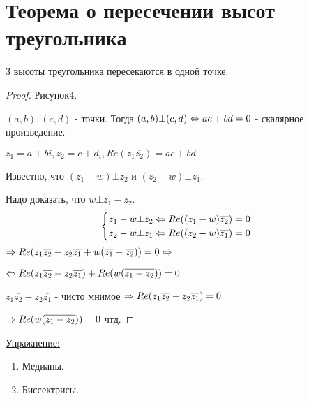 \section{Теорема о пересечении высот треугольника}
\begin{theorem}{} 3 высоты треугольника пересекаются в одной точке.
\end{theorem}
\begin{proof}
Рисунок4.

$(a, b), (c, d)$ - точки. Тогда $(a, b) \bot (c, d) \Leftrightarrow ac + bd = 0$ - скалярное произведение.

$z_1 = a + bi, z_2 = c + d_i, Re(z_1\overline{z_2}) = ac + bd$

Известно, что $(z_1 - w) \bot z_2$ и $(z_2 - w) \bot z_1$.

Надо доказать, что $w \bot z_1 - z_2$.
$$
\begin{cases}
	z_1 - w \bot z_2 \Leftrightarrow Re((z_1 - w)\overline{z_2}) = 0 \\
	z_2 - w \bot z_1 \Leftrightarrow Re((z_2 - w)\overline{z_1}) = 0
\end{cases}
$$$\Rightarrow Re(z_1\overline{z_2} - z_2\overline{z_1} + w(\overline{z_1} - \overline{z_2})) = 0 \Leftrightarrow$

$\Leftrightarrow Re(z_1\overline{z_2} - z_2\overline{z_1}) + Re(w(\overline{z_1 - z_2})) = 0$

$z_1\overline{z_2} - z_2\overline{z_1}$ - чисто мнимое $\Rightarrow Re(z_1\overline{z_2} - z_2\overline{z_1}) = 0$

$\Rightarrow Re(w(\overline{z_1 - z_2})) = 0$ чтд.  

\end{proof}

\underline{Упражнение:}
\begin{enumerate}
\item Медианы.
\item Биссектрисы.
\end{enumerate}